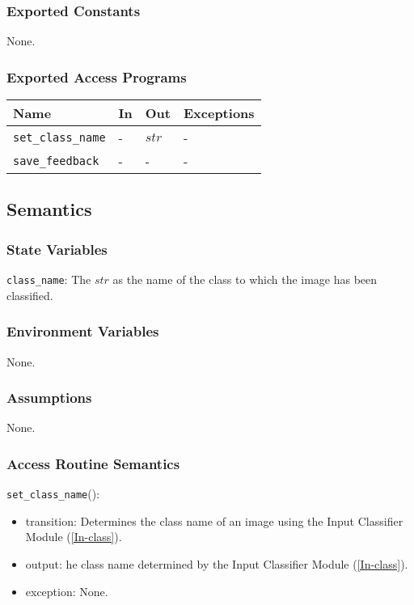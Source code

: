 \documentclass[12pt, titlepage]{article}
\def\code#1{\texttt{#1}}
\begin{document}
\subsubsection{Exported Constants}
None.

\subsubsection{Exported Access Programs}

\begin{center}
\begin{tabular}{p{3cm} p{4cm} p{4cm} p{3cm}}
\hline
\textbf{Name} & \textbf{In} & \textbf{Out} & \textbf{Exceptions} \\
\hline
\code{set\_class\_name} & - & $str$ & - \\
\code{save\_feedback} & - & - &  -\\
\hline
\end{tabular}
\end{center}

\subsection{Semantics}

\subsubsection{State Variables}
\code{class\_name}: The $str$ as the name of the class to which the image has been classified.

\subsubsection{Environment Variables}
None.

\subsubsection{Assumptions}
None.

\subsubsection{Access Routine Semantics}

\noindent \code{set\_class\_name}():
\begin{itemize}
  \item transition: Determines the class name of an image using the Input Classifier Module (\ref{In-class}).
  \item output: he class name determined by the Input Classifier Module (\ref{In-class}).
  \item exception: None.
\end{itemize}
\end{document}
